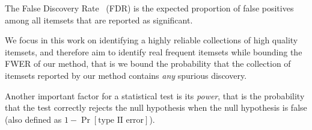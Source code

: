 \begin{definition}\label{def:FDR}
 The False Discovery Rate~\citep{BenjaminiH95} (FDR) is the expected proportion of
 false positives among all itemsets that are reported as significant.
\end{definition}

We focus in this work on identifying a highly reliable collections of high quality itemsets, and therefore aim to identify real frequent itemsets while bounding the FWER of our method, that is we bound the probability that the collection of itemsets reported by our method contains \emph{any} spurious discovery. 

Another important factor for a statistical test is its \emph{power}, that is the probability that the test correctly
rejects the null hypothesis when the null hypothesis is false (also defined as $1-\Pr[\text{type II error}]$).
